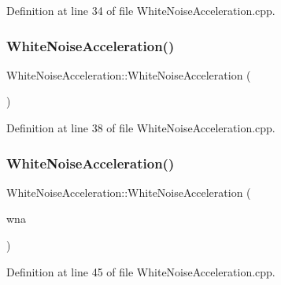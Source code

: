 Definition at line 34 of file White\+Noise\+Acceleration.\+cpp.

\mbox{\label{classbfl_1_1WhiteNoiseAcceleration_aae68b94c0d82a6fa594e0e1feba7e272}} 
\subsubsection{\texorpdfstring{White\+Noise\+Acceleration()}{WhiteNoiseAcceleration()}\hspace{0.1cm}{\footnotesize\ttfamily [3/5]}}
{\footnotesize\ttfamily White\+Noise\+Acceleration\+::\+White\+Noise\+Acceleration (\begin{DoxyParamCaption}{ }\end{DoxyParamCaption})\hspace{0.3cm}{\ttfamily [noexcept]}}



Definition at line 38 of file White\+Noise\+Acceleration.\+cpp.

\mbox{\label{classbfl_1_1WhiteNoiseAcceleration_ac01e4702a8fbce92a7fd0adf74472e5a}} 
\subsubsection{\texorpdfstring{White\+Noise\+Acceleration()}{WhiteNoiseAcceleration()}\hspace{0.1cm}{\footnotesize\ttfamily [4/5]}}
{\footnotesize\ttfamily White\+Noise\+Acceleration\+::\+White\+Noise\+Acceleration (\begin{DoxyParamCaption}\item[{const \mbox{\hyperlink{classbfl_1_1WhiteNoiseAcceleration}{White\+Noise\+Acceleration}} \&}]{wna }\end{DoxyParamCaption})}



Definition at line 45 of file White\+Noise\+Acceleration.\+cpp.

